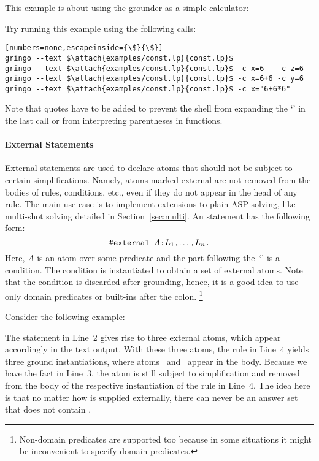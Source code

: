 \begin{example}
This example is about using the grounder as a simple calculator:
%

%
Try running this example using the following calls:
%
\begin{lstlisting}[numbers=none,escapeinside={\$}{\$}]
gringo --text $\attach{examples/const.lp}{const.lp}$
gringo --text $\attach{examples/const.lp}{const.lp}$ -c x=6   -c z=6
gringo --text $\attach{examples/const.lp}{const.lp}$ -c x=6+6 -c y=6
gringo --text $\attach{examples/const.lp}{const.lp}$ -c x="6+6*6"
\end{lstlisting}
%
Note that quotes have to be added to prevent the shell from expanding the `\code{*}' in the last call
or from interpreting parentheses in functions.
\end{example}

\paragraph{External Statements}
%
External statements are used to declare atoms
that should not be subject to certain simplifications.
Namely,
atoms marked external are not removed from the bodies of rules, conditions, etc.,
even if they do not appear in the head of any rule.
The main use case is to implement extensions to plain ASP solving,
like multi-shot solving detailed in Section~\ref{sec:multi}.
An  statement has the following form:
%
\[\texttt{\#external~$A$:$L_1$,$\dots$,$L_n$.}\]
%
Here, $A$ is an atom over some predicate and
the part following the~`\code{:}' is a condition.
The condition is instantiated to obtain a set of external atoms.
Note that the condition is discarded after grounding,
hence, it is a good idea to use only domain predicates or built-ins after the colon.%
\footnote{Non-domain predicates are supported too
because in some situations it might be inconvenient to specify domain predicates.}

\begin{example}
Consider the following example:%
%

%
The  statement in Line~2 gives rise to three external atoms,
which appear accordingly in the text output.
With these three atoms,
the rule in Line~4 yields three ground instantiations,
where atoms~ and~ appear in the body.
Because we have the fact  in Line~3,
the atom  is still subject to simplification
and removed from the body of the respective instantiation of the rule in Line~4.
The idea here is that no matter how  is supplied externally,
there can never be an answer set that does not contain .
\end{example}

